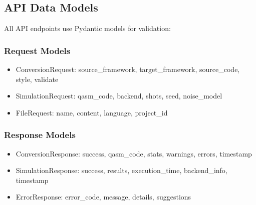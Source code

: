 \subsection{API Data Models}

All API endpoints use Pydantic models for validation:

\subsubsection{Request Models}
\begin{itemize}
    \item ConversionRequest: source\_framework, target\_framework, source\_code, style, validate
    \item SimulationRequest: qasm\_code, backend, shots, seed, noise\_model
    \item FileRequest: name, content, language, project\_id
\end{itemize}

\subsubsection{Response Models}
\begin{itemize}
    \item ConversionResponse: success, qasm\_code, stats, warnings, errors, timestamp
    \item SimulationResponse: success, results, execution\_time, backend\_info, timestamp
    \item ErrorResponse: error\_code, message, details, suggestions
\end{itemize}

 
